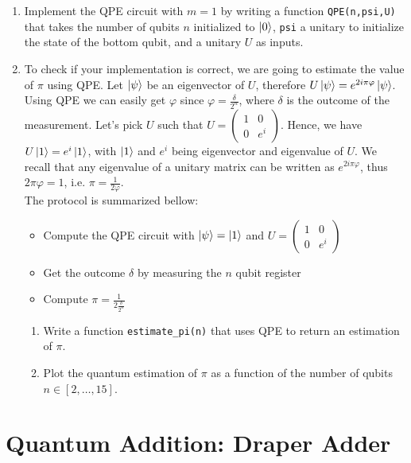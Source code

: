 \documentclass{article}
\begin{document}
\begin{enumerate}
    \item Implement the QPE circuit with $m=1$ by writing a function \verb|QPE(n,psi,U)| that takes the number of qubits $n$ initialized to $\ket{0}$, \verb|psi| a unitary to initialize the state of the bottom qubit, and a unitary $U$ as inputs.
    \item To check if your implementation is correct, we are going to estimate the value of $\pi$ using QPE. Let $\ket{\psi}$ be an eigenvector of $U$, therefore $U\ket{\psi}=e^{2i\pi\varphi}\ket{\psi}$. Using QPE we can easily get $\varphi$ since $\varphi=\frac{\delta}{2^n}$, where $\delta$ is the outcome of the measurement. Let's pick $U$ such that $U=\begin{pmatrix}
        1 & 0 \\ 0 & e^{i}
    \end{pmatrix}$. Hence, we have $U\ket{1}=e^i\ket{1}$, with $\ket{1}$ and $e^i$ being eigenvector and eigenvalue of $U$. We recall that any eigenvalue of a unitary matrix can be written as $e^{2i\pi\varphi}$, thus $2\pi\varphi=1$, i.e. $\pi=\frac{1}{2\varphi}$. \\
    The protocol is summarized bellow:
    \begin{itemize}
        \item Compute the QPE circuit with $\ket{\psi}=\ket{1}$ and $U=\begin{pmatrix}
        1 & 0 \\ 0 & e^{i}
    \end{pmatrix}$
    \item Get the outcome $\delta$ by measuring the $n$ qubit register
    \item Compute $\pi=\frac{1}{2\frac{\delta}{2^n}}$
    \end{itemize}
    
    \begin{enumerate}
        \item Write a function \verb|estimate_pi(n)| that uses QPE to return an estimation of $\pi$.
        \item Plot the quantum estimation of $\pi$ as a function of the number of qubits $n\in [2,\dots,15]$.
    \end{enumerate}
\end{enumerate}

\section{Quantum Addition: Draper Adder}
\end{document}
